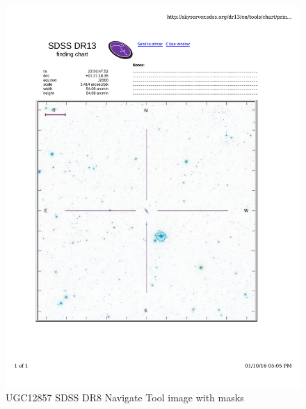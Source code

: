 \documentclass[10pt,letterpaper]{article}
\begin{document}
\begin{figure}[h!]
\centering
\includegraphics[scale=0.7]{figures/UGC12857.pdf}
\caption{UGC12857 SDSS DR8 Navigate Tool image with masks}
\end{figure}

\clearpage
\end{document}
